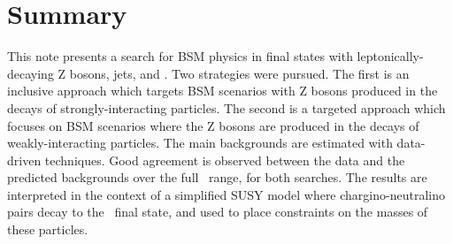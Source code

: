 \section{Summary}

This note presents a search for BSM physics in final states with leptonically-decaying Z bosons, jets, and \MET. 
Two strategies were pursued. The first is an inclusive approach which targets BSM scenarios with Z bosons produced
in the decays of strongly-interacting particles. The second is a targeted approach which focuses on BSM scenarios
where the Z bosons are produced in the decays of weakly-interacting particles. The main backgrounds are
estimated with data-driven techniques. Good agreement is observed between the data and the predicted backgrounds
over the full \MET\ range, for both searches. The results are interpreted in the context of a simplified SUSY
model where chargino-neutralino pairs decay to the \wzmet\ final state, and used to place constraints on the
masses of these particles.
